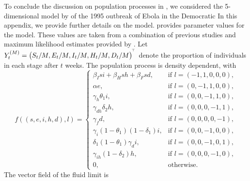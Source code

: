 To conclude the discussion on population processes in , we considered the 5-dimensional model by \citet{LegrandEtAl_2007_UnderstandingDynamicsEbola} of the 1995 outbreak of Ebola in the Democratic
In this appendix, we provide further details on the model.
 provides parameter values for the model.
These values are taken from a combination of previous studies \citet{DowellEtAl_1999_TransmissionEbolaHemorrhagic,KhanEtAl_1999_ReemergenceEbolaHemorrhagic,BwakaEtAl_1999_EbolaHemorrhagicFever,NdambiEtAl_1999_EpidemiologicClinicalAspects} and maximum likelihood estimates provided by \citet{LegrandEtAl_2007_UnderstandingDynamicsEbola}.
Let \(Y_t^{(M)} = \left(S_t / M, E_t / M, I_t / M, H_t / M, D_t / M\right)^{^{\!\top}}\) denote the proportion of individuals in each stage after \(t\) weeks.
The population process is density dependent, with
\[
	f\!\left(\left(s, e, i, h, d\right)\!, l\right) = \begin{cases}
		\beta_I s i + \beta_H sh + \beta_F sd,                        & \text{if } l = \left(-1, 1, 0, 0, 0\right), \\
		\alpha e,                                                     & \text{if } l = \left(0, -1, 1, 0, 0\right), \\
		\gamma_h \theta_1 i,                                          & \text{if } l = \left(0, 0, -1, 1, 0\right), \\
		\gamma_{dh}\delta_2 h,                                        & \text{if } l = \left(0, 0, 0, -1, 1\right), \\
		\gamma_f d,                                                   & \text{if } l = \left(0, 0, 0, 0, -1\right), \\
		\gamma_i\left(1 - \theta_1\right)\left(1 - \delta_1\right) i, & \text{if } l = \left(0,0,-1,0,0\right),     \\
		\delta_1\left(1 - \theta_1\right)\gamma_d i,                  & \text{if } l = \left(0,0,-1,0,1\right),     \\
		\gamma_{ih}\left(1 - \delta_2\right)h,                        & \text{if } l = \left(0,0,0,-1,0\right),     \\
		0,                                                            & \text{otherwise}.
	\end{cases}
\]
The vector field of the fluid limit is
